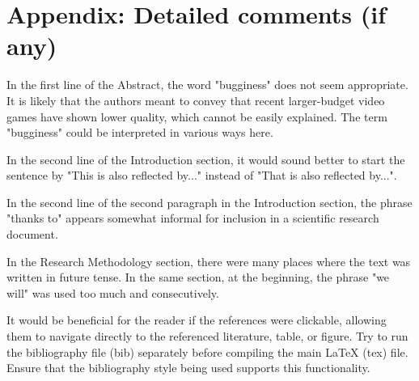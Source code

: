 \documentclass[conference]{IEEEtran}
\begin{document}
\section*{Appendix: Detailed comments (if any)}
In the first line of the Abstract, the word "bugginess" does not seem appropriate. It is likely that the authors meant to convey that recent larger-budget video games have shown lower quality, which cannot be easily explained. The term "bugginess" could be interpreted in various ways here.

In the second line of the Introduction section, it would sound better to start the sentence by "This is also reflected by..." instead of "That is also reflected by...".

In the second line of the second paragraph in the Introduction section, the phrase "thanks to" appears somewhat informal for inclusion in a scientific research document.

In the Research Methodology section, there were many places where the text was written in future tense. In the same section, at the beginning, the phrase "we will" was used too much and consecutively.

It would be beneficial for the reader if the references were clickable, allowing them to navigate directly to the referenced literature, table, or figure. Try to run the bibliography file (bib) separately before compiling the main LaTeX (tex) file. Ensure that the bibliography style being used supports this functionality.




\vspace{12pt}
\end{document}

